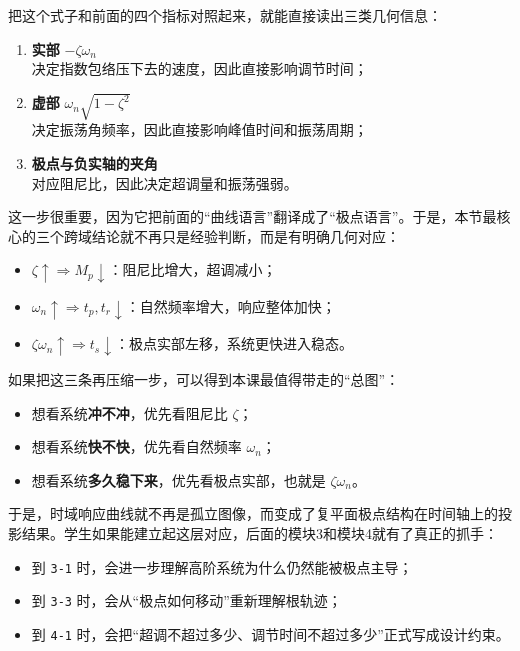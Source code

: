 \documentclass[
  11pt]{article}
\providecommand{\tightlist}{%
  \setlength{\itemsep}{0pt}\setlength{\parskip}{0pt}}
\begin{document}
把这个式子和前面的四个指标对照起来，就能直接读出三类几何信息：

\begin{enumerate}
\def\labelenumi{\arabic{enumi}.}
\tightlist
\item
  \textbf{实部} \(-\zeta\omega_n\)\\
  决定指数包络压下去的速度，因此直接影响调节时间；
\item
  \textbf{虚部} \(\omega_n\sqrt{1-\zeta^2}\)\\
  决定振荡角频率，因此直接影响峰值时间和振荡周期；
\item
  \textbf{极点与负实轴的夹角}\\
  对应阻尼比，因此决定超调量和振荡强弱。
\end{enumerate}

这一步很重要，因为它把前面的``曲线语言''翻译成了``极点语言''。于是，本节最核心的三个跨域结论就不再只是经验判断，而是有明确几何对应：

\begin{itemize}
\tightlist
\item
  \(\zeta \uparrow \Rightarrow M_p \downarrow\)：阻尼比增大，超调减小；
\item
  \(\omega_n \uparrow \Rightarrow t_p, t_r \downarrow\)：自然频率增大，响应整体加快；
\item
  \(\zeta\omega_n \uparrow \Rightarrow t_s \downarrow\)：极点实部左移，系统更快进入稳态。
\end{itemize}

如果把这三条再压缩一步，可以得到本课最值得带走的``总图''：

\begin{itemize}
\tightlist
\item
  想看系统\textbf{冲不冲}，优先看阻尼比 \(\zeta\)；
\item
  想看系统\textbf{快不快}，优先看自然频率 \(\omega_n\)；
\item
  想看系统\textbf{多久稳下来}，优先看极点实部，也就是
  \(\zeta\omega_n\)。
\end{itemize}

于是，时域响应曲线就不再是孤立图像，而变成了复平面极点结构在时间轴上的投影结果。学生如果能建立起这层对应，后面的模块3和模块4就有了真正的抓手：

\begin{itemize}
\tightlist
\item
  到 \texttt{3-1} 时，会进一步理解高阶系统为什么仍然能被极点主导；
\item
  到 \texttt{3-3} 时，会从``极点如何移动''重新理解根轨迹；
\item
  到 \texttt{4-1}
  时，会把``超调不超过多少、调节时间不超过多少''正式写成设计约束。
\end{itemize}
\end{document}
